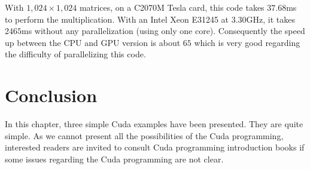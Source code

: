 With $1,024  \times 1,024$ matrices,  on a C2070M  Tesla card, this  code takes
$37.68$ms to perform the multiplication. With an Intel Xeon E31245 at $3.30$GHz, it
takes $2465$ms  without any parallelization (using only  one core). Consequently
the speed up  between the CPU and GPU  version is about $65$ which  is very good
regarding the difficulty of parallelizing this code.



\section{Conclusion}
In this chapter, three simple Cuda examples have been  presented. They are
quite  simple. As we  cannot  present  all the  possibilities  of  the  Cuda
programming, interested  readers  are  invited  to  consult  Cuda  programming
introduction books if some issues regarding the Cuda programming are not clear.


